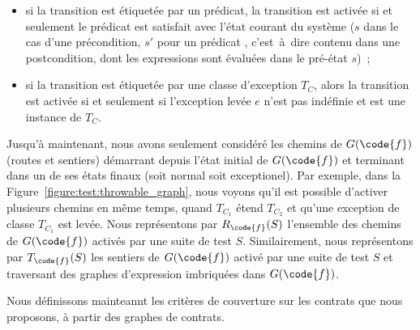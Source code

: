 \begin{itemize}
\item si la transition est étiquetée par un prédicat, la transition est activée
si et seulement le prédicat est satisfait avec l'état courant du système ($s$
dans le cas d'une précondition, $s'$ pour un prédicat ,
c'est~à~dire contenu dans une postcondition, dont les expressions \aold{\empty}
sont évaluées dans le pré-état $s$)~;

\item si la transition est étiquetée par une classe d'exception $T_C$, alors la
transition est activée si et seulement si l'exception levée $e$ n'est pas
indéfinie et est une instance de $T_C$.

\end{itemize}

Jusqu'à maintenant, nous avons seulement considéré les chemins de $G(\code{f})$
(routes et sentiers) démarrant depuis l'état initial de $G(\code{f})$ et
terminant dans un de ses états finaux (soit normal soit exceptionel). Par
exemple, dans la Figure~\ref{figure:test:throwable_graph}, nous voyons qu'il est
possible d'activer plusieurs chemins en même temps, quand $T_{C_1}$ étend
$T_{C_2}$ et qu'une exception de classe $T_{C_1}$ est levée. Nous représentons
par $R_\code{f}(S)$ l'ensemble des chemins de $G(\code{f})$ activés par une
suite de test $S$. Similairement, nous représentons par $T_\code{f}(S)$ les
sentiers de $G(\code{f})$ activé par une suite de test $S$ et traversant des
graphes d'expression imbriquées dans $G(\code{f})$.

Nous définissons mainteannt les critères de couverture sur les contrats que nous
proposons, à partir des graphes de contrats.

